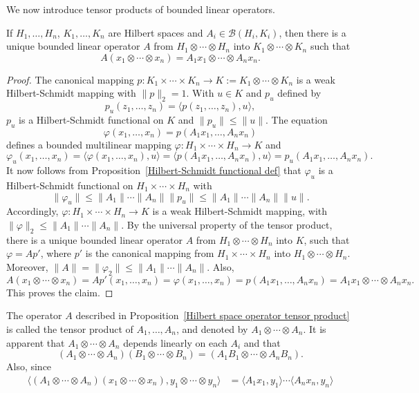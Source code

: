 We now introduce tensor products of bounded linear operators.
\begin{proposition}\label{Hilbert space operator tensor product}
If $H_1,\dots,H_n$, $K_1,\dots,K_n$ are Hilbert spaces and $A_i\in\mathcal{B}(H_i,K_i)$, then there is a unique bounded linear operator $A$ from $H_1\otimes\cdots\otimes H_n$ into $K_1\otimes\cdots\otimes K_n$ such that
\[A(x_1\otimes\cdots\otimes x_n)=A_1x_1\otimes\cdots\otimes A_nx_n.\]
\end{proposition}
\begin{proof}
The canonical mapping $p:K_1\times\cdots\times K_n\to K:=K_1\otimes\cdots\otimes K_n$ is a weak Hilbert-Schmidt mapping with $\|p\|_2=1$. With $u\in K$ and $p_u$ defined by
\[p_u(z_1,\dots,z_n)=\langle p(z_1,\dots,z_n),u\rangle,\]
$p_u$ is a Hilbert-Schmidt functional on $K$ and $\|p_u\|\leq\|u\|$. The equation
\[\varphi(x_1,\dots,x_n)=p(A_1x_1,\dots,A_nx_n)\]
defines a bounded multilinear mapping $\varphi:H_1\times\cdots\times H_n\to K$ and
\[\varphi_u(x_1,\dots,x_n)=\langle\varphi(x_1,\dots,x_n),u\rangle=\langle p(A_1x_1,\dots,A_nx_n),u\rangle=p_u(A_1x_1,\dots,A_nx_n).\]
It now follows from Proposition~\ref{Hilbert-Schmidt functional def} that $\varphi_u$ is a Hilbert-Schmidt functional on $H_1\times\cdots\times H_n$ with
\[\|\varphi_u\|\leq\|A_1\|\cdots\|A_n\|\|p_u\|\leq\|A_1\|\cdots\|A_n\|\|u\|.\]
Accordingly, $\varphi:H_1\times\cdots\times H_n\to K$ is a weak Hilbert-Schmidt mapping, with $\|\varphi\|_2\leq\|A_1\|\cdots\|A_n\|$. By the universal property of the tensor product, there is a unique bounded linear operator $A$ from $H_1\otimes\cdots\otimes H_n$ into $K$, such that $\varphi=Ap'$, where $p'$ is the canonical mapping from $H_1\times\cdots\times H_n$ into $H_1\otimes\cdots\otimes H_n$. Moreover, $\|A\|=\|\varphi_2\|\leq\|A_1\|\cdots\|A_n\|$. Also,
\[A(x_1\otimes\cdots\otimes x_n)=Ap'(x_1,\dots,x_n)=\varphi(x_1,\dots,x_n)=p(A_1x_1,\dots,A_nx_n)=A_1x_1\otimes\cdots\otimes A_nx_n.\]
This proves the claim.
\end{proof}
The operator $A$ described in Proposition~\ref{Hilbert space operator tensor product} is called the tensor product of $A_1,\dots,A_n$, and denoted by $A_1\otimes\cdots\otimes A_n$. It is apparent that $A_1\otimes\cdots\otimes A_n$ depends linearly on each $A_i$ and that
\[(A_1\otimes\cdots\otimes A_n)(B_1\otimes\cdots\otimes B_n)=(A_1B_1\otimes\cdots\otimes A_nB_n).\]
Also, since
\begin{align*}
\langle(A_1\otimes\cdots\otimes A_n)(x_1\otimes\cdots\otimes x_n),y_1\otimes\cdots\otimes y_n\rangle&=\langle A_1x_1,y_1\rangle\cdots\langle A_nx_n,y_n\rangle
\end{align*}
